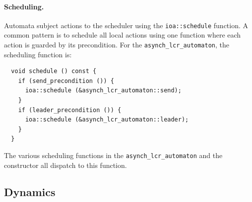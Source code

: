 \paragraph{Scheduling.}
Automata subject actions to the scheduler using the \verb+ioa::schedule+ function.
A common pattern is to schedule all local actions using one function where each action is guarded by its precondition.
For the \verb+asynch_lcr_automaton+, the scheduling function is:
\begin{lstlisting}
  void schedule () const {
    if (send_precondition ()) {
      ioa::schedule (&asynch_lcr_automaton::send);
    }
    if (leader_precondition ()) {
      ioa::schedule (&asynch_lcr_automaton::leader);
    }
  }
\end{lstlisting}
The various scheduling functions in the \verb+asynch_lcr_automaton+ and the constructor all dispatch to this function.

\subsection{Dynamics}


